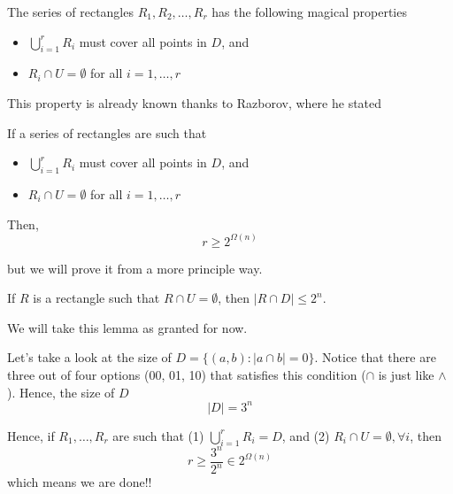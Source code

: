 \begin{proposition}
	The series of rectangles $R_1, R_2, \dots, R_r$ has the following magical properties
	\begin{itemize}
		\item $\bigcup_{i = 1}^r R_i$ must cover all points in $D$, and 
		\item $R_i \cap U = \emptyset$ for all $i = 1, \dots, r$
	\end{itemize}
\end{proposition}

This property is already known thanks to Razborov, where he stated
\begin{theorem}
	If a series of rectangles are such that 
	\begin{itemize}
		\item $\bigcup_{i = 1}^r R_i$ must cover all points in $D$, and 
		\item $R_i \cap U = \emptyset$ for all $i = 1, \dots, r$
	\end{itemize}
	Then, 
	\begin{equation}
		r \geq 2^{\Omega(n)}
	\end{equation}
\end{theorem}
but we will prove it from a more principle way. 

\begin{lemma}
	\label{lemma:rectanglelemma}
	If $R$ is a rectangle such that $R\cap U = \emptyset$, then $|R \cap D| \leq 2^n$. 
\end{lemma}
We will take this lemma as granted for now. 

Let's take a look at the size of $D = \{ (a, b) : |a \cap b| = 0 \}$. Notice that there are three out of four options (00, 01, 10) that satisfies this condition ($\cap$ is just like $\land$). Hence, the size of $D$
\begin{equation}
	|D| = 3^n
\end{equation}

Hence, if $R_1, \dots, R_r$ are such that (1) $\bigcup_{i = 1}^r R_i = D$, and (2) $R_i \cap U = \emptyset, \forall i$, then 
\begin{equation}
	r \geq  \frac{3^n}{2^n} \in 2^{\Omega (n)}
\end{equation}
which means we are done!!


 






































